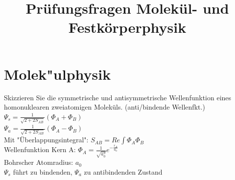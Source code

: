 \documentclass[a5paper,12pt,ngerman,grid=front %
,print
]{kartei}
\title{Prüfungsfragen Molekül- und Festkörperphysik}
\begin{document}
\setcardpagelayout

\section*{Molek"ulphysik}



	\begin{karte}{
		Skizzieren Sie die symmetrische und antisymmetrische Wellenfunktion eines 
		homonuklearen zweiatomigen Moleküls. (anti/bindende Wellenfkt.)
		}
		$\Psi_s=\frac{1}{\sqrt{2+2S_{AB}}}(\Phi_A+\Phi_B)$ \\
		
		$\Psi_a=\frac{1}{\sqrt{2+2S_{AB}}}(\Phi_A-\Phi_B)$ \\
		
		Mit "Überlappungsintegral": $S_{AB}=Re \int \Phi_A \Phi_B$ \\
		
		Wellenfunktion Kern A: $ \Phi_A= \frac{1}{\sqrt{a_0^3}}e^{-\frac{r_A}{a_0}}$ \\
		
		Bohrscher Atomradius: $a_0$ \\
		
		$\Psi_s$ führt zu bindenden, $\Psi_a$ zu antibindenden Zustand
		
	\end{karte}
\end{document}
